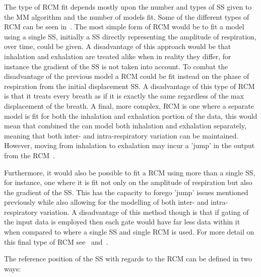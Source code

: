                 The type of \gls{RCM} fit depends mostly upon the number and types of \gls{SS} given to the \gls{MM} algorithm and the number of models fit. Some of the different types of \gls{RCM} can be seen in~. The most simple form of \gls{RCM} would be to fit a model using a single \gls{SS}, initially a \gls{SS} directly representing the amplitude of respiration, over time, could be given. A disadvantage of this approach would be that inhalation and exhalation are treated alike when in reality they differ, for instance the gradient of the \gls{SS} is not taken into account. To combat the disadvantage of the previous model a \gls{RCM} could be fit instead on the phase of respiration from the initial displacement \gls{SS}. A disadvantage of this type of \gls{RCM} is that it treats every breath as if it is exactly the same regardless of the max displacement of the breath. A final, more complex, \gls{RCM} is one where a separate model is fit for both the inhalation and exhalation portion of the data, this would mean that combined the  can model both inhalation and exhalation separately, meaning that both inter- and intra-respiratory variation can be maintained. However, moving from inhalation to exhalation may incur a 'jump' in the output from the \gls{RCM}~\parencite{McClelland2013}.
                
                Furthermore, it would also be possible to fit a \gls{RCM} using more than a single \gls{SS}, for instance, one where it is fit not only on the amplitude of respiration but also the gradient of the \gls{SS}. This has the capacity to forego 'jump' issues mentioned previously while also allowing for the modelling of both inter- and intra-respiratory variation. A disadvantage of this method though is that if gating of the input data is employed then each gate would have far less data within it when compared to where a single \gls{SS} and single \gls{RCM} is used. For more detail on this final type of \gls{RCM} see~ and~.
                
                The reference position of the \gls{SS} with regards to the \gls{RCM} can be defined in two ways:
            
